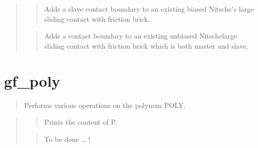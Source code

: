 \documentclass[a4paper,11pt,english]{sphinxmanual}
\begin{document}
\begin{quote}
\begin{quote}
Adds a slave contact boundary to an existing biased Nitsche’s large sliding contact
with friction brick.
\end{quote}

\begin{quote}

Adds a contact boundary to an existing unbiased Nitschelarge sliding contact
with friction brick which is both master and slave.
\end{quote}
\end{quote}


\section{gf\_poly}
\label{\detokenize{matlab_octave/cmdref_gf_poly:gf-poly}}\label{\detokenize{matlab_octave/cmdref_gf_poly::doc}}

\begin{sphinxVerbatim}[commandchars=\\\{\}]
  
  
\end{sphinxVerbatim}

\begin{quote}

Performs various operations on the polynom POLY.
\end{quote}

\begin{quote}

\begin{quote}

Prints the content of P.
\end{quote}

\begin{quote}

To be done … !
\end{quote}
\end{quote}
\end{document}
